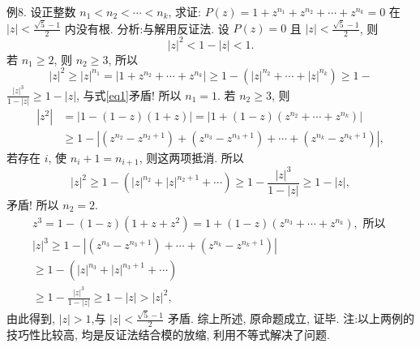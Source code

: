例8. 设正整数 $n_1<n_2<\cdots<n_k$, 求证: $P(z)=1+z^{n_1}+z^{n_2}+\cdots+ z^{n_k}=0$ 在 $|z|<\frac{\sqrt{5}-1}{2}$ 内没有根.
分析:与解用反证法.
设 $P(z)=0$ 且 $|z|<\frac{\sqrt{5}-1}{2}$, 则
$$
|z|^2<1-|z|<1 . \label{eq1}
$$
若 $n_1 \geqslant 2$, 则 $n_2 \geqslant 3$, 所以
$$
|z|^2 \geqslant|z|^{n_1}=\left|1+z^{n_2}+\cdots+z^{n_k}\right| \geqslant 1-\left(|z|^{n_2}+\cdots+|z|^{n_k}\right) \geqslant 1-
$$
$\frac{|z|^3}{1-|z|} \geqslant 1-|z|$, 与式\ref{eq1}矛盾!
所以 $n_1=1$.
若 $n_2 \geqslant 3$, 则
$$
\begin{aligned}
\left|z^2\right| & =|1-(1-z)(1+z)|=\left|1+(1-z)\left(z^{n_2}+\cdots+z^{n_k}\right)\right| \\
& \geqslant 1-\left|\left(z^{n_2}-z^{n_2+1}\right)+\left(z^{n_3}-z^{n_3+1}\right)+\cdots+\left(z^{n_k}-z^{n_k+1}\right)\right|,
\end{aligned}
$$
若存在 $i$, 使 $n_i+1=n_{i+1}$, 则这两项抵消.
所以
$$
|z|^2 \geqslant 1-\left(|z|^{n_2}+|z|^{n_2+1}+\cdots\right) \geqslant 1-\frac{|z|^3}{1-|z|} \geqslant 1-|z|,
$$
矛盾!
所以 $n_2=2$.
$$
\begin{gathered}
z^3=1-(1-z)\left(1+z+z^2\right)=1+(1-z)\left(z^{n_3}+\cdots+z^{n_k}\right), \text { 所以 } \\
|z|^3 \geqslant 1-\left|\left(z^{n_3}-z^{n_3+1}\right)+\cdots+\left(z^{n_k}-z^{n_k+1}\right)\right| \\
\geqslant 1-\left(|z|^{n_3}+|z|^{n_3+1}+\cdots\right) \\
\geqslant 1-\frac{|z|^3}{1-|z|} \geqslant 1-|z|>|z|^2,
\end{gathered}
$$
由此得到, $|z|>1$,与 $|z|<\frac{\sqrt{5}-1}{2}$ 矛盾.
综上所述, 原命题成立, 证毕.
注:以上两例的技巧性比较高, 均是反证法结合模的放缩, 利用不等式解决了问题.


